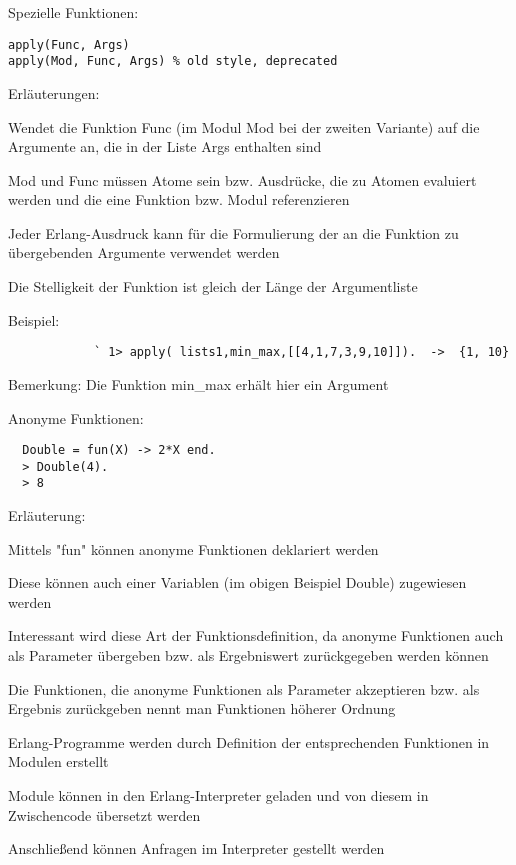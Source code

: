 \documentclass[10pt]{article}
\begin{document}
Spezielle Funktionen:
\begin{lstlisting}
apply(Func, Args)
apply(Mod, Func, Args) % old style, deprecated
\end{lstlisting}
\begin{itemize*}
  \item Erläuterungen:
  \item Wendet die Funktion Func (im Modul Mod bei der zweiten Variante) auf die Argumente an, die in der Liste Args enthalten sind
  \item Mod und Func müssen Atome sein bzw. Ausdrücke, die zu Atomen evaluiert werden und die eine Funktion bzw. Modul referenzieren
  \item Jeder Erlang-Ausdruck kann für die Formulierung der an die Funktion zu übergebenden Argumente verwendet werden
  \item Die Stelligkeit der Funktion ist gleich der Länge der Argumentliste
  \item Beispiel:
  \begin{lstlisting}
            ` 1> apply( lists1,min_max,[[4,1,7,3,9,10]]).  ->  {1, 10}
          \end{lstlisting}
  \item Bemerkung: Die Funktion min\_max erhält hier ein Argument
\end{itemize*}

Anonyme Funktionen:
\begin{lstlisting}
  Double = fun(X) -> 2*X end.
  > Double(4).
  > 8
\end{lstlisting}
\begin{itemize*}
  \item Erläuterung:
  \item Mittels "fun" können anonyme Funktionen deklariert werden
  \item Diese können auch einer Variablen (im obigen Beispiel Double) zugewiesen werden
  \item Interessant wird diese Art der Funktionsdefinition, da anonyme Funktionen auch als Parameter übergeben bzw. als Ergebniswert zurückgegeben werden können
  \item Die Funktionen, die anonyme Funktionen als Parameter akzeptieren bzw. als Ergebnis zurückgeben nennt man Funktionen höherer Ordnung
\end{itemize*}

\begin{itemize*}
  \item Erlang-Programme werden durch Definition der entsprechenden Funktionen in Modulen erstellt
  \item Module können in den Erlang-Interpreter geladen und von diesem in Zwischencode übersetzt werden
  \item Anschließend können Anfragen im Interpreter gestellt werden
\end{itemize*}
\end{document}
